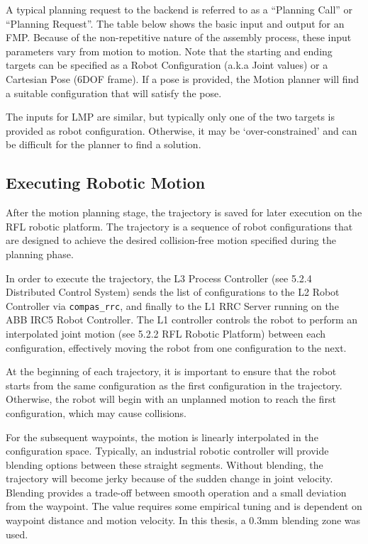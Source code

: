A typical planning request to the backend is referred to as a “Planning Call” or “Planning Request”. The table below shows the basic input and output for an FMP. Because of the non-repetitive nature of the assembly process, these input parameters vary from motion to motion. Note that the starting and ending targets can be specified as a Robot Configuration (a.k.a Joint values) or a Cartesian Pose (6DOF frame). If a pose is provided, the Motion planner will find a suitable configuration that will satisfy the pose.

The inputs for LMP are similar, but typically only one of the two targets is provided as robot configuration. Otherwise, it may be ‘over-constrained’ and can be difficult for the planner to find a solution.


\subsection{Executing Robotic Motion}

After the motion planning stage, the trajectory is saved for later execution on the RFL robotic platform. The trajectory is a sequence of robot configurations that are designed to achieve the desired collision-free motion specified during the planning phase.

In order to execute the trajectory, the L3 Process Controller (see 5.2.4 Distributed Control System) sends the list of configurations to the L2 Robot Controller via \verb|compas_rrc|, and finally to the L1 RRC Server running on the ABB IRC5 Robot Controller. The L1 controller controls the robot to perform an interpolated joint motion (see 5.2.2 RFL Robotic Platform) between each configuration, effectively moving the robot from one configuration to the next.

At the beginning of each trajectory, it is important to ensure that the robot starts from the same configuration as the first configuration in the trajectory. Otherwise, the robot will begin with an unplanned motion to reach the first configuration, which may cause collisions.

For the subsequent waypoints, the motion is linearly interpolated in the configuration space. Typically, an industrial robotic controller will provide blending options between these straight segments. Without blending, the trajectory will become 	jerky because of the sudden change in joint velocity. Blending provides a trade-off between smooth operation and a small deviation from the waypoint. The value requires some empirical tuning and is dependent on waypoint distance and motion velocity. In this thesis, a 0.3mm blending zone was used. 

